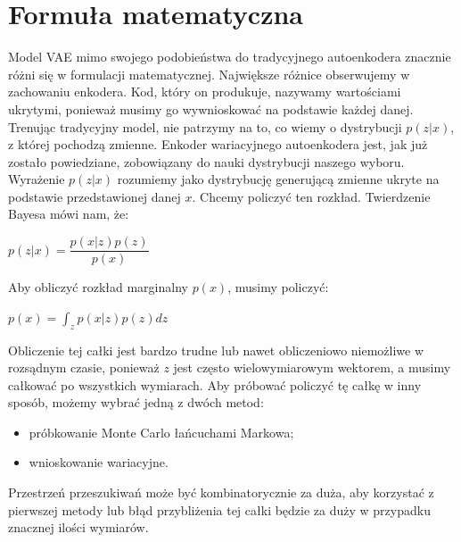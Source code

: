\documentclass[a4paper,12pt,oneside]{book} %
\begin{document}
\section{Formuła matematyczna}
Model VAE mimo swojego podobieństwa do tradycyjnego autoenkodera znacznie różni się w formulacji matematycznej. Największe różnice obserwujemy w zachowaniu enkodera. Kod, który on produkuje, nazywamy wartościami ukrytymi, ponieważ musimy go wywnioskować na podstawie każdej danej. Trenując tradycyjny model, nie patrzymy na to, co wiemy o dystrybucji $p(z|x)$, z której pochodzą zmienne. Enkoder wariacyjnego autoenkodera jest, jak już zostało powiedziane, zobowiązany do nauki dystrybucji naszego wyboru. Wyrażenie $p(z|x)$ rozumiemy jako dystrybucję generującą zmienne ukryte na podstawie przedstawionej danej $x$. Chcemy policzyć ten rozkład. Twierdzenie Bayesa mówi nam, że:
\begin{center}
	$p(z|x)=\dfrac{p(x|z)p(z)}{p(x)}$
\end{center}
Aby obliczyć rozkład marginalny $p(x)$, musimy policzyć:
\begin{center}
	$p(x) = \displaystyle\int_{z}^{}p(x|z)p(z)dz$
\end{center}
Obliczenie tej całki jest bardzo trudne lub nawet obliczeniowo niemożliwe w rozsądnym czasie, ponieważ $z$ jest często wielowymiarowym wektorem, a musimy całkować po wszystkich wymiarach. Aby próbować policzyć tę całkę w inny sposób, możemy wybrać jedną z dwóch metod:
\begin{itemize}
	\item próbkowanie Monte Carlo łańcuchami Markowa;
	\item wnioskowanie wariacyjne.
\end{itemize}
Przestrzeń przeszukiwań może być kombinatorycznie za duża, aby korzystać z pierwszej metody lub błąd przybliżenia tej całki będzie za duży w przypadku znacznej ilości wymiarów.
\end{document}
